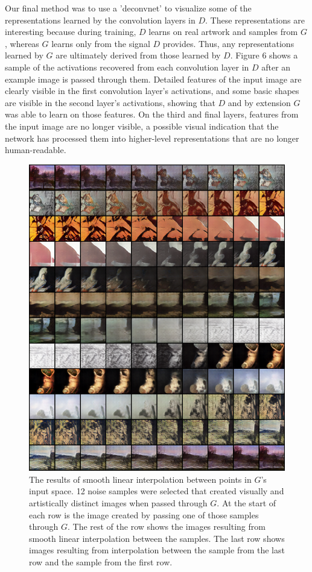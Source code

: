 \documentclass[10pt,twocolumn,letterpaper]{article}
\begin{document}
Our final method was to use a 'deconvnet' to visualize some of the representations learned by the convolution layers in $ D $. These representations are interesting because during training, $ D $ learns on real artwork and samples from $ G $, whereas $ G $ learns only from the signal $ D $ provides. Thus, any representations learned by $ G $ are ultimately derived from those learned by $ D $. Figure 6 shows a sample of the activations recovered from each convolution layer in $ D $ after an example image is passed through them. Detailed features of the input image are clearly visible in the first convolution layer's activations, and some basic shapes are visible in the second layer's activations, showing that $ D $ and by extension $ G $ was able to learn on those features. On the third and final layers, features from the input image are no longer visible, a possible visual indication that the network has processed them into higher-level representations that are no longer human-readable. 

\begin{figure}[t]
	\begin{center}
		\includegraphics[width=0.9\linewidth]{interp.png}
	\end{center}
	\caption{The results of smooth linear interpolation between points in $ G $'s input space. 12 noise samples were selected that created visually and artistically distinct images when passed through $ G $. At the start of each row is the image created by passing one of those samples through $ G $. The rest of the row shows the images resulting from smooth linear interpolation between the samples. The last row shows images resulting from interpolation between the sample from the last row and the sample from the first row. }
	\label{fig:long}
	\label{fig:onecol}
\end{figure}
\end{document}
